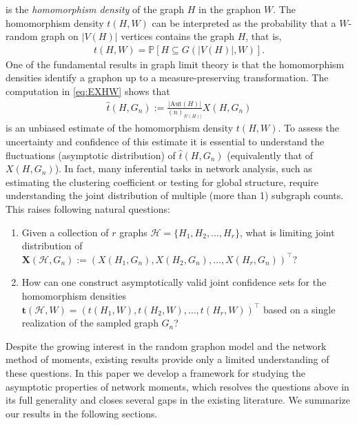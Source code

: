 \documentclass[11pt,reqno]{amsart}
\numberwithin{equation}{section}
\newcommand{\cH}{{\mathcal H}}
\theoremstyle{definition}
\begin{document}
is the {\it homomorphism density} of the graph $H$ in the graphon $W$. The homomorphism density $t(H,W)$ can be interpreted as the probability that a $W$-random graph on $|V(H)|$ vertices contains the graph $H$, that is,
\begin{align*}
    t(H,W) = \mathbb{P}\left[H\subseteq G(|V(H)|,W)\right].
\end{align*} 
One of the fundamental results in graph limit theory is that the homomorphism densities identify a graphon up to a measure-preserving transformation. The computation in \eqref{eq:EXHW} shows that 
\begin{align}\label{eq:tHGncount}
\hat t(H, G_n) := \frac{|\text{Aut}(H)|}{(n)_{|V(H)|}} X(H, G_n) 
\end{align}
is an unbiased estimate of the homomorphism density $t(H, W)$. To assess the uncertainty and confidence of this estimate it is essential to understand the fluctuations (asymptotic distribution) of $\hat t(H, G_n)$ (equivalently that of $X(H, G_n)$). In fact, many inferential tasks in network analysis, such as estimating the clustering coefficient or testing for global structure, require understanding the joint distribution of multiple (more than 1) subgraph counts. This raises following natural questions: 



\begin{enumerate}[label=\textrm{(Q\arabic*)}]\label{enum: Over-Dim Settings}
    \item\label{item:jointdistribution} Given a collection of $r$ graphs $\cH= \{H_1, H_2, \ldots, H_r\}$, what is limiting joint distribution of $\bm X(\cH, G_n) := (X(H_1, G_n), X(H_2, G_n), \ldots, X(H_r, G_n))^\top$?

\item \label{item:confidenceinterval} How can one construct asymptotically valid joint confidence sets for the homomorphism densities 
$\bm t(\cH, W) = (t(H_1, W), t(H_2, W), \ldots, t(H_r, W))^\top$ based on a single realization of the sampled graph $G_n$?  

\end{enumerate}

Despite the growing interest in the random graphon model and the network method of moments, existing results provide only a limited understanding of  these questions. In this paper we develop a framework for studying the asymptotic properties of network moments, which resolves the questions above in its full generality and closes several gaps in the existing literature. We summarize our results in the following sections. 
\end{document}

